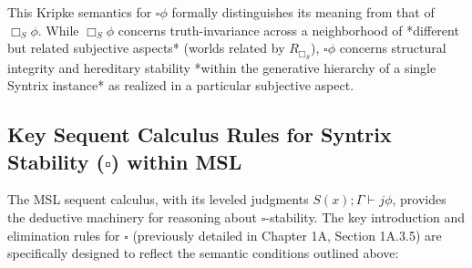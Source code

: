 \documentclass[
    12pt,              %
    a4paper,           %
    headings=normal,   %
    twoside=true,      %
    BCOR=8mm,          %
]{scrbook}
\newcommand{\BoxS}{\Box_S}
\newcommand{\BoxSyn}{\square}
\newcommand{\turnstilek}[1][]{\vdash^{#1}}
\begin{document}
This Kripke semantics for \(\BoxSyn \phi\) formally distinguishes its meaning from that of \(\BoxS \phi\). While \(\BoxS \phi\) concerns truth-invariance across a neighborhood of *different but related subjective aspects* (worlds related by \(R_{\BoxS}\)), \(\BoxSyn \phi\) concerns structural integrity and hereditary stability *within the generative hierarchy of a single Syntrix instance* as realized in a particular subjective aspect.

\subsection{Key Sequent Calculus Rules for Syntrix Stability (\(\BoxSyn\)) within MSL}
\label{sec:ch2_sequent_rules_stability_syntrix} 

The MSL sequent calculus, with its leveled judgments \(S(x); \Gamma \turnstilek{j} \phi\), provides the deductive machinery for reasoning about \(\BoxSyn\)-stability. The key introduction and elimination rules for \(\BoxSyn\) (previously detailed in Chapter 1A, Section 1A.3.5) are specifically designed to reflect the semantic conditions outlined above:
\end{document}
